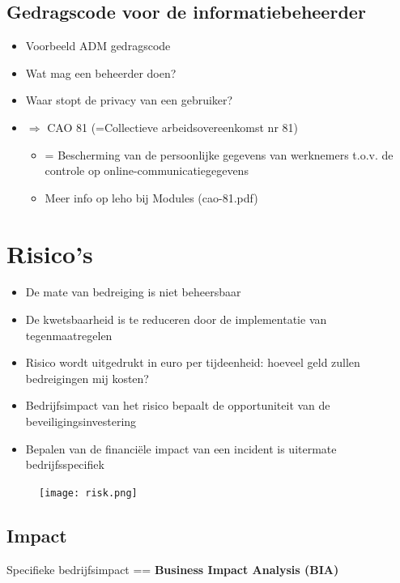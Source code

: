 \documentclass{article}
\newcommand{\bold}[1]{\textbf{#1}}
\begin{document}
\subsection{Gedragscode voor de informatiebeheerder}

\begin{itemize}
    \item Voorbeeld ADM gedragscode
    \item Wat mag een beheerder doen?
    \item Waar stopt de privacy van een gebruiker?
    \item $\Rightarrow$ CAO 81 (=Collectieve arbeidsovereenkomst nr 81)
    \begin{itemize}
        \item = Bescherming van de persoonlijke gegevens van werknemers t.o.v. de controle op online-communicatiegegevens
        \item Meer info op leho bij Modules (cao-81.pdf)
    \end{itemize}
\end{itemize}

\section{Risico's}

\begin{itemize}
    \item De mate van bedreiging is niet beheersbaar
    \item De kwetsbaarheid is te reduceren door de implementatie van tegenmaatregelen
    \item Risico wordt uitgedrukt in euro per tijdeenheid: hoeveel geld zullen bedreigingen mij kosten?
    \item Bedrijfsimpact van het risico bepaalt de opportuniteit van de beveiligingsinvestering
    \item Bepalen van de financiële impact van een incident is uitermate bedrijfsspecifiek
\end{itemize}

\begin{figure}[H]
    \centering
    \texttt{[image: risk.png]}
    \caption{}
\end{figure}

\subsection{Impact}

Specifieke bedrijfsimpact == \bold{Business Impact Analysis (BIA)}
\end{document}
